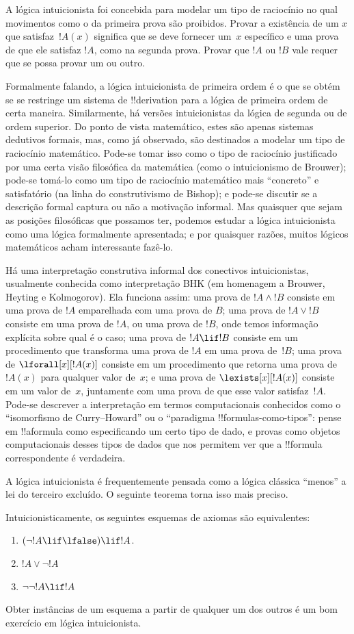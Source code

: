 \documentclass[../../../include/open-logic-section]{subfiles}
\begin{document}
A lógica intuicionista foi concebida para modelar um tipo de
raciocínio no qual movimentos como o da primeira prova são
proibidos. Provar a existência de um $x$ que satisfaz~$!A(x)$ significa
que se deve fornecer um~$x$ específico e uma prova de que ele satisfaz
$!A$, como na segunda prova. Provar que $!A$ ou $!B$ vale requer que
se possa provar um ou outro.

Formalmente falando, a lógica intuicionista de primeira ordem é o que se
obtém se se restringe um sistema de !!{derivation} para a lógica de
primeira ordem de certa maneira. Similarmente, há versões intuicionistas
da lógica de segunda ou de ordem superior. Do ponto de vista matemático,
estes são apenas sistemas dedutivos formais, mas, como já observado, são
destinados a modelar um tipo de raciocínio matemático. Pode-se tomar
isso como o tipo de raciocínio justificado por uma certa visão
filosófica da matemática (como o intuicionismo de Brouwer); pode-se
tomá-lo como um tipo de raciocínio matemático mais ``concreto'' e
satisfatório (na linha do construtivismo de Bishop); e pode-se discutir
se a descrição formal captura ou não a motivação informal. Mas quaisquer
que sejam as posições filosóficas que possamos ter, podemos estudar a
lógica intuicionista como uma lógica formalmente apresentada; e por
quaisquer razões, muitos lógicos matemáticos acham interessante fazê-lo.

Há uma interpretação construtiva informal dos conectivos intuicionistas,
usualmente conhecida como interpretação BHK (em homenagem a Brouwer,
Heyting e Kolmogorov). Ela funciona assim: uma prova de $!A
\land !B$ consiste em uma prova de $!A$ emparelhada com uma prova de
$B$; uma prova de $!A \lor !B$ consiste em uma prova de $!A$, ou uma
prova de $!B$, onde temos informação explícita sobre qual é o caso; uma
prova de $!A \lif !B$ consiste em um procedimento que transforma uma
prova de $!A$ em uma prova de~$!B$; uma prova de $\lforall[x][!A(x)]$
consiste em um procedimento que retorna uma prova de $!A(x)$ para
qualquer valor de~$x$; e uma prova de $\lexists[x][!A(x)]$ consiste em
um valor de~$x$, juntamente com uma prova de que esse valor
satisfaz~$!A$. Pode-se descrever a interpretação em termos
computacionais conhecidos como o ``isomorfismo de Curry--Howard'' ou o
``paradigma !!{formula}s-como-tipos'': pense em !!a{formula} como
especificando um certo tipo de dado, e provas como objetos computacionais
desses tipos de dados que nos permitem ver que a !!{formula} correspondente
é verdadeira.

A lógica intuicionista é frequentemente pensada como a lógica clássica
``menos'' a lei do terceiro excluído. O seguinte teorema torna isso mais
preciso.
\begin{thm}
Intuicionisticamente, os seguintes esquemas de axiomas são equivalentes:
\begin{enumerate}
\item $(\lnot !A \lif \lfalse) \lif !A$.
\item $!A \lor \lnot !A$
\item $\lnot \lnot !A \lif !A$
\end{enumerate}
\end{thm}
Obter instâncias de um esquema a partir de qualquer um dos outros é um bom
exercício em lógica intuicionista.
\end{document}
